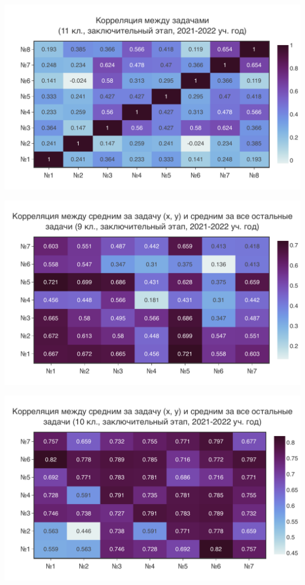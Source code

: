 \includegraphics[width=\linewidth]{../export/pdf/results/2022/respa/grade11.pdf}

\includegraphics[width=\linewidth]{../export/pdf/results/2022/respa/grade9-avg.pdf}

\includegraphics[width=\linewidth]{../export/pdf/results/2022/respa/grade10-avg.pdf}

